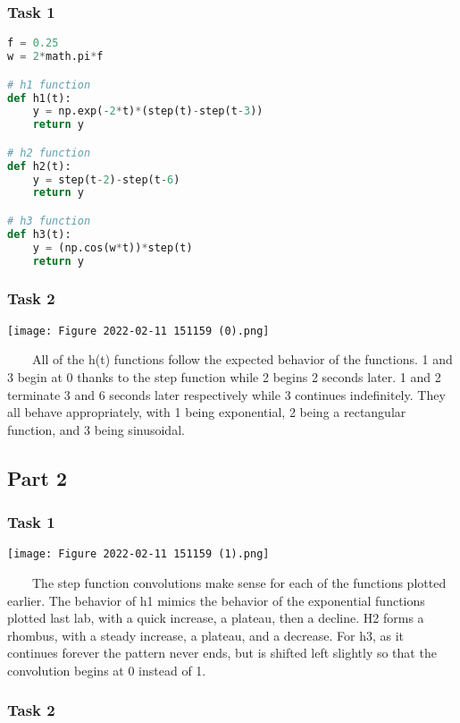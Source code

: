 \documentclass[11pt,a4]{article}
\begin{document}
\subsubsection{Task 1}

\begin{lstlisting}[language=Python]
f = 0.25
w = 2*math.pi*f

# h1 function
def h1(t):
    y = np.exp(-2*t)*(step(t)-step(t-3))
    return y

# h2 function
def h2(t):
    y = step(t-2)-step(t-6)
    return y

# h3 function
def h3(t):
    y = (np.cos(w*t))*step(t)
    return y
\end{lstlisting}

\subsubsection{Task 2}

\texttt{[image: Figure 2022-02-11 151159 (0).png]}

\ \ \ \ All of the h(t) functions follow the expected behavior of the functions. 1 and 3 begin at 0 thanks to the step function while 2 begins 2 seconds later. 1 and 2 terminate 3 and 6 seconds later respectively while 3 continues indefinitely. They all behave appropriately, with 1 being exponential, 2 being a rectangular function, and 3 being sinusoidal.

\subsection{Part 2}

\subsubsection{Task 1}

\texttt{[image: Figure 2022-02-11 151159 (1).png]}

\ \ \ \ The step function convolutions make sense for each of the functions plotted earlier. The behavior of h1 mimics the behavior of the exponential functions plotted last lab, with a quick increase, a plateau, then a decline. H2 forms a rhombus, with a steady increase, a plateau, and a decrease. For h3, as it continues forever the pattern never ends, but is shifted left slightly so that the convolution begins at 0 instead of 1.

\subsubsection{Task 2}
\end{document}
